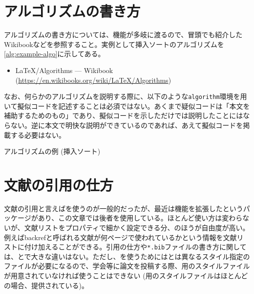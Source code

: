 \section{アルゴリズムの書き方}
\label{sec:write-algorithm}

アルゴリズムの書き方については、機能が多岐に渡るので、冒頭でも紹介したWikibookなどを参照すること。実例として挿入ソートのアルゴリズムを\cref{alg:example-algo}に示してある。
\begin{itemize}
  \item \textsf{LaTeX/Algorithms --- Wikibook} \\(\url{https://en.wikibooks.org/wiki/LaTeX/Algorithms})
\end{itemize}

なお、何らかのアルゴリズムを説明する際に、以下のような\texttt{algorithm}環境を用いて擬似コードを記述することは必須ではない。あくまで疑似コードは「本文を補助するためのもの」であり、擬似コードを示しただけでは説明したことにはならない。逆に本文で明快な説明ができているのであれば、あえて擬似コードを掲載する必要はない。

\begin{algorithm}[!h]
  \caption{アルゴリズムの例 (挿入ソート)}
  \label{alg:example-algo}
  \begin{algorithmic}[1]
            \EndWhile
        \EndFor
    \EndProcedure
  \end{algorithmic}
\end{algorithm}

\section{文献の引用の仕方}
\label{sec:cite-articles}

文献の引用と言えば\bibtex を使うのが一般的だったが、最近は機能を拡張した\biblatex というパッケージがあり、この文章では後者を使用している。ほとんど使い方は変わらないが、文献リストをプロパティで細かく設定できる分、\biblatex のほうが自由度が高い。例えばbackrefと呼ばれる文献が何ページで使われているかという情報を文献リストに付け加えることができる。引用の仕方や\texttt{*.bib}ファイルの書き方に関しては、\bibtex と\biblatex で大きな違いはない。ただし、\biblatex を使うためには\bibtex とは異なるスタイル指定のファイルが必要になるので、学会等に論文を投稿する際、\biblatex 用のスタイルファイルが用意されていなければ使うことはできない (\bibtex 用のスタイルファイルはほとんどの場合、提供されている)。


